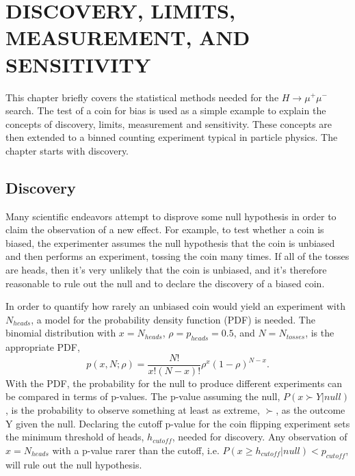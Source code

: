 \chapter{DISCOVERY, LIMITS, MEASUREMENT, AND SENSITIVITY} \label{coinflip}

This chapter briefly covers the statistical methods needed for the $H\rightarrow\mu^+\mu^-$ search. The test of a coin for bias is used as a simple example to explain the concepts of discovery, limits, measurement and sensitivity. These concepts are then extended to a binned counting experiment typical in particle physics. The chapter starts with discovery. 

\section{Discovery}

Many scientific endeavors attempt to disprove some null hypothesis in order to claim the observation of a new effect. For example, to test whether a coin is biased, the experimenter assumes the null hypothesis that the coin is unbiased and then performs an experiment, tossing the coin many times. If all of the tosses are heads, then it's very unlikely that the coin is unbiased, and it's therefore reasonable to rule out the null and to declare the discovery of a biased coin. 

In order to quantify how rarely an unbiased coin would yield an experiment with $N_{heads}$, a model for the probability density function (PDF) is needed. The binomial distribution with $x = N_{heads}$, $\rho = p_{heads} = 0.5$, and $N = N_{tosses}$, is the appropriate PDF,
\begin{equation}
p(x,N;\rho) = \frac{N!}{x! (N - x)!}\rho^{x}(1-\rho)^{N-x}.
\end{equation}
With the PDF, the probability for the null to produce different experiments can be compared in terms of p-values. The p-value assuming the null, $P(x \succ Y|null)$, is the probability to observe something at least as extreme, $\succ$, as the outcome Y given the null. Declaring the cutoff p-value for the coin flipping experiment sets the minimum threshold of heads, $h_{cutoff}$, needed for discovery. Any observation of $x=N_{heads}$ with a p-value rarer than the cutoff, i.e. $P(x \geq h_{cutoff}|null) < p_{cutoff}$, will rule out the null hypothesis. 

